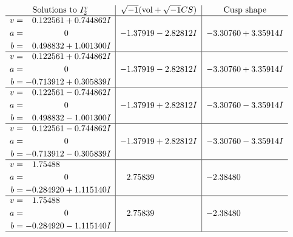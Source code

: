 \documentclass[1p]{elsarticle_modified}
\theoremstyle{definition}
\newcommand{\I}{\sqrt{-1}}
\begin{document}
$$\begin{array}{c|c|c}  
\text{Solutions to }I^v_{2}& \I (\text{vol} + \sqrt{-1}CS) & \text{Cusp shape}\\
 \hline 
\begin{aligned}
v &= \phantom{-}0.122561 + 0.744862 I \\
a &= \phantom{-0.000000 } 0 \\
b &= \phantom{-}0.498832 + 1.001300 I\end{aligned}
 & -1.37919 - 2.82812 I & -3.30760 + 3.35914 I \\ \hline\begin{aligned}
v &= \phantom{-}0.122561 + 0.744862 I \\
a &= \phantom{-0.000000 } 0 \\
b &= -0.713912 + 0.305839 I\end{aligned}
 & -1.37919 - 2.82812 I & -3.30760 + 3.35914 I \\ \hline\begin{aligned}
v &= \phantom{-}0.122561 - 0.744862 I \\
a &= \phantom{-0.000000 } 0 \\
b &= \phantom{-}0.498832 - 1.001300 I\end{aligned}
 & -1.37919 + 2.82812 I & -3.30760 - 3.35914 I \\ \hline\begin{aligned}
v &= \phantom{-}0.122561 - 0.744862 I \\
a &= \phantom{-0.000000 } 0 \\
b &= -0.713912 - 0.305839 I\end{aligned}
 & -1.37919 + 2.82812 I & -3.30760 - 3.35914 I \\ \hline\begin{aligned}
v &= \phantom{-}1.75488\phantom{ +0.000000I} \\
a &= \phantom{-0.000000 } 0 \\
b &= -0.284920 + 1.115140 I\end{aligned}
 & \phantom{-}2.75839\phantom{ +0.000000I} & -2.38480\phantom{ +0.000000I} \\ \hline\begin{aligned}
v &= \phantom{-}1.75488\phantom{ +0.000000I} \\
a &= \phantom{-0.000000 } 0 \\
b &= -0.284920 - 1.115140 I\end{aligned}
 & \phantom{-}2.75839\phantom{ +0.000000I} & -2.38480\phantom{ +0.000000I}\\
 \hline 
 \end{array}$$\newpage
\end{document}
